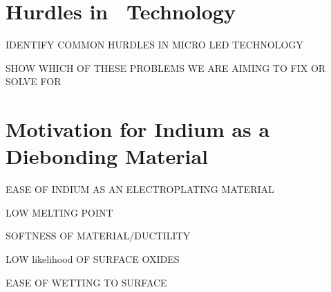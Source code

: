 \section{Hurdles in \uled \ Technology}

IDENTIFY COMMON HURDLES IN MICRO LED TECHNOLOGY

SHOW WHICH OF THESE PROBLEMS WE ARE AIMING TO FIX OR SOLVE FOR


\section{Motivation for Indium as a Diebonding Material}

EASE OF INDIUM AS AN ELECTROPLATING MATERIAL

LOW MELTING POINT

SOFTNESS OF MATERIAL/DUCTILITY

LOW likelihood OF SURFACE OXIDES

EASE OF WETTING TO SURFACE
